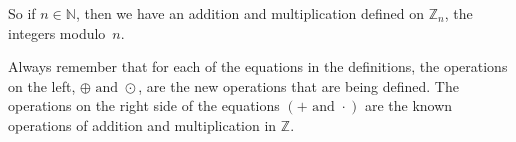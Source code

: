 %
%
%
%
%
So if $n \in \mathbb{N}$, then we have an addition and multiplication defined on  
$\mathbb{Z}_n $, the integers modulo~$n$.  

Always remember that for each of the equations in the definitions, the operations on the left, 
$ \oplus \text{ and } \odot $, are the new operations that are being defined.  The operations on the right side of the equations $\left( + \text{ and } \cdot \right)$ are the known operations of addition and multiplication in  $\mathbb{Z}$.

